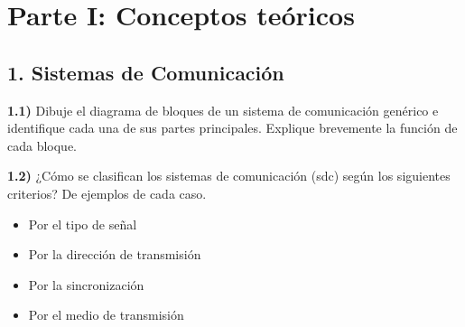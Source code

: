\section*{Parte I: Conceptos teóricos}

\subsection*{1. Sistemas de Comunicación}

\textbf{1.1)} Dibuje el diagrama de bloques de un sistema de comunicación genérico e identifique cada una de sus partes principales. Explique brevemente la función de cada bloque.

\textbf{1.2)} ¿Cómo se clasifican los sistemas de comunicación (sdc) según los siguientes criterios? De ejemplos de cada caso.
\begin{itemize}
    \item Por el tipo de señal
    \item Por la dirección de transmisión
    \item Por la sincronización
    \item Por el medio de transmisión
\end{itemize}